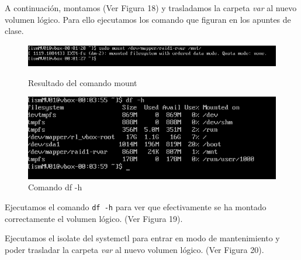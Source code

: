 A continuación, montamos (Ver Figura 18) y trasladamos la carpeta \textit{var} al nuevo volumen lógico. Para ello ejecutamos los comando que figuran en los apuntes de clase.

\begin{figure}[htbp]
  \centering
  \begin{minipage}[b]{0.45\textwidth}
      \centering
      \includegraphics[width=\textwidth]{images/Bloque1/mount.png}
      \caption{Resultado del comando mount}
  \end{minipage}
  \hfill
  \begin{minipage}[b]{0.45\textwidth}
      \centering
      \includegraphics[width=\textwidth]{images/Bloque1/df.png}
      \caption{Comando df -h}
  \end{minipage}
\end{figure}

  Ejecutamos el comando \texttt{df -h} para ver que efectivamente se ha montado correctamente el volumen lógico. (Ver Figura 19).

  Ejecutamos el isolate del systemctl para entrar en modo de mantenimiento y poder trasladar la carpeta \textit{var} al nuevo volumen lógico. (Ver Figura 20).

